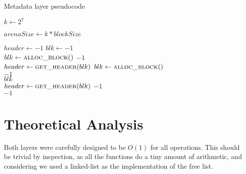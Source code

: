 \documentclass[12pt]{report}
\begin{document}
    \begin{algorithm}
        \caption{Metadata layer pseudocode}
        \label{code:mem_meta}
        \begin{algorithmic}[1]

            \State $k \gets 2^7$

            \State $arenaSize \gets k * blockSize$

                \State $header \gets -1$
                \State $blk \gets -1$ \\

                \State $blk \gets \Call{alloc\_block}{ }$
                    \State \Return $-1$
                \EndIf\\

                \State $header \gets \Call{get\_header}{blk}$
                    \State $blk \gets \Call{alloc\_block}{ }$
                \EndIf\\

                    \State \Return $-1$
                \EndIf\\

                \State {}
                \State \Return $blk$
            \EndFunction\\
                \State $header \gets \Call{get\_header}{blk}$
                    \State \Return $-1$
                \EndIf\\

                    \State \Return $-1$
                \EndIf\\

                \State {}
                \State {}
            \EndFunction
        \end{algorithmic}
    \end{algorithm}


\section{Theoretical Analysis}
    Both layers were carefully designed to be $O(1)$ for all operations. This
    should be trivial by inspection, as all the functions do a tiny amount of
    arithmetic, and considering we used a linked-list as the implementation of
    the free list.
\end{document}
